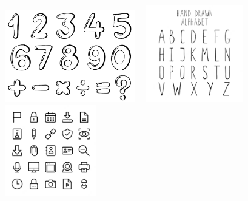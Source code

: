 \includegraphics[width=2.23393in,height=1.58569in]{media/image6.png}
\includegraphics[width=1.96211in,height=1.66818in]{media/image7.png}
\includegraphics[width=1.56875in,height=1.56875in]{media/image8.png}






